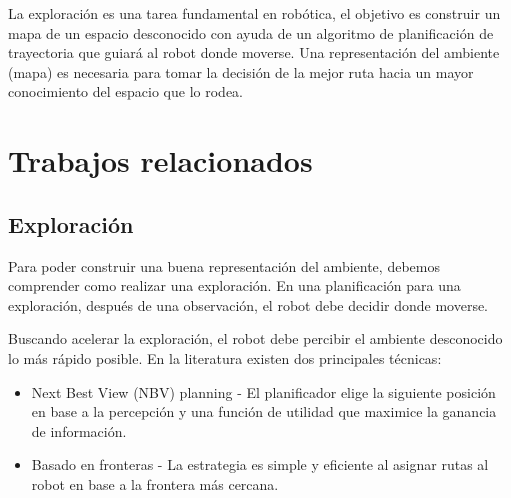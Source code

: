 
La exploración es una tarea fundamental en robótica, el objetivo es construir un mapa de un espacio desconocido con ayuda de un algoritmo de planificación de trayectoria que guiará al robot donde moverse. Una representación del ambiente (mapa) es necesaria para tomar la decisión de la mejor ruta hacia un mayor conocimiento del espacio que lo rodea.



\section{Trabajos relacionados} \label{}

\subsection{Exploración}

Para poder construir una buena representación del ambiente, debemos comprender como realizar una exploración. En una planificación para una exploración, después de una observación, el robot debe decidir donde moverse.

Buscando acelerar la exploración, el robot debe percibir el ambiente desconocido lo más rápido posible. En la literatura existen dos principales técnicas:

\begin{itemize}\setlength{\itemsep}{-1mm}
\item Next Best View (NBV) planning - El planificador elige la siguiente posición en base a la percepción y una función de utilidad que maximice la ganancia de información. 
\item Basado en fronteras - La estrategia es simple y eficiente al asignar rutas al robot en base a la frontera más cercana.
\end{itemize}


